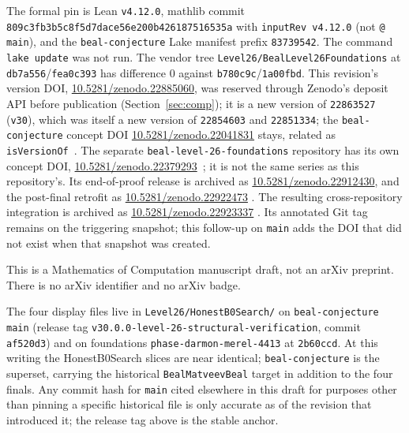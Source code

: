 The formal pin is Lean \texttt{v4.12.0}, mathlib commit
\texttt{809c3fb3b5c8f5d7dace56e200b426187516535a} with
\texttt{inputRev v4.12.0} (not \texttt{@ main}), and the
\texttt{beal-conjecture} Lake manifest prefix \texttt{83739542}.
The command \texttt{lake update} was not run. The vendor tree
\texttt{Level26/BealLevel26Foundations} at \texttt{db7a556}/\texttt{fea0c393}
has difference $0$ against \texttt{b780c9c}/\texttt{1a00fbd}.
This revision's version DOI,
\href{https://doi.org/10.5281/zenodo.22885060}{10.5281/zenodo.22885060},
was reserved through Zenodo's deposit API before publication
(Section~\ref{sec:comp}); it is a new version of \texttt{22863527}
(\texttt{v30}), which was itself a new version of \texttt{22854603}
and \texttt{22851334}; the \texttt{beal-conjecture} concept DOI
\href{https://doi.org/10.5281/zenodo.22041831}{10.5281/zenodo.22041831}
stays, related as \texttt{isVersionOf}~\cite{zenodo-v31,zenodo-concept}.
The separate \texttt{beal-level-26-foundations} repository has its
own concept DOI,
\href{https://doi.org/10.5281/zenodo.22379293}{10.5281/zenodo.22379293}~\cite{zenodo-concept-foundations};
it is not the same series as this repository's.
Its end-of-proof release
 is archived as
\href{https://doi.org/10.5281/zenodo.22912430}{10.5281/zenodo.22912430},
and the post-final  retrofit as
\href{https://doi.org/10.5281/zenodo.22922473}{10.5281/zenodo.22922473}
\cite{zenodo-foundations-v3017,zenodo-foundations-v2501}.
The resulting cross-repository integration is archived as
\href{https://doi.org/10.5281/zenodo.22923337}{10.5281/zenodo.22923337}
\cite{zenodo-integrated}. Its annotated Git tag remains on the triggering
snapshot; this follow-up on \texttt{main} adds the DOI that did not exist
when that snapshot was created.

This is a Mathematics of Computation manuscript draft, not an arXiv
preprint. There is no arXiv identifier and no arXiv badge.

The four display files live in
\texttt{Level26/HonestB0Search/} on \texttt{beal-conjecture}
\texttt{main} (release tag
\texttt{v30.0.0-level-26-structural-verification}, commit
\texttt{af520d3}) and on foundations
\texttt{phase-darmon-merel-4413} at \texttt{2b60ccd}. At this
writing the HonestB0Search slices are near identical;
\texttt{beal-conjecture} is the superset, carrying the historical
\texttt{BealMatveevBeal} target in addition to the four finals. Any
commit hash for \texttt{main} cited elsewhere in this draft for
purposes other than pinning a specific historical file is only
accurate as of the revision that introduced it; the release tag
above is the stable anchor.
